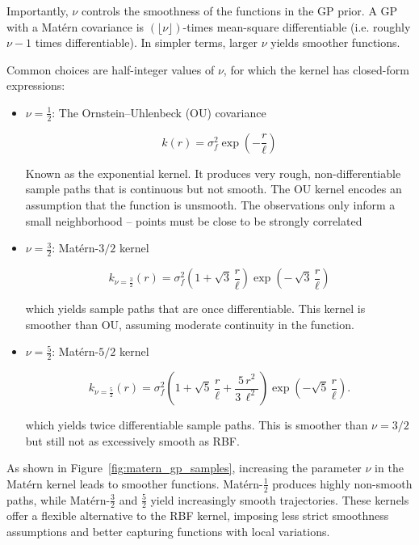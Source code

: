 \documentclass{ut-thesis}
\begin{document}
Importantly, $\nu$ controls the smoothness of the functions in the GP prior. A GP with a Matérn covariance is $(\lfloor \nu \rfloor)$-times mean-square differentiable (i.e. roughly $\nu - 1$ times differentiable). In simpler terms, larger $\nu$ yields smoother functions. 

Common choices are half-integer values of $\nu$, for which the kernel has closed-form expressions:

\begin{itemize}
    \item $\nu = \frac{1}{2}$: The Ornstein–Uhlenbeck (OU) covariance
    
    \begin{equation}
    k(r) = \sigma_f^2 \exp\left( -\frac{r}{\ell}\right)
    \end{equation}

    Known as the exponential kernel. It produces very rough, non-differentiable sample paths that is continuous but not smooth. The OU kernel encodes an assumption that the function is unsmooth. The observations only inform a small neighborhood – points must be close to be strongly correlated

    \item $\nu = \frac{3}{2}$: Matérn-$3/2$ kernel

    \begin{equation}
        k_{\nu=\frac{3}{2}}(r) = \sigma_f^2 
        \left(1 + \sqrt{3}\,\frac{r}{\ell}\right)\exp\!\left(-\,\sqrt{3}\,\frac{r}{\ell}\right)
    \end{equation}

    which yields sample paths that are once differentiable. This kernel is smoother than OU, assuming moderate continuity in the function.

    \item $\nu = \frac{5}{2}$: Matérn-$5/2$ kernel

    \begin{equation}
        k_{\nu=\frac{5}{2}}(r) = \sigma_f^2 \left(1 + \sqrt{5}\,\frac{r}{\ell}+ \frac{5\,r^2}{3\,\ell^2}\right)\exp\!\left(-\sqrt{5}\,\frac{r}{\ell}\right).
    \end{equation}

    which yields twice differentiable sample paths. This is smoother than $\nu=3/2$ but still not as excessively smooth as RBF.
\end{itemize}

As shown in Figure~\ref{fig:matern_gp_samples}, increasing the parameter \( \nu \) in the Matérn kernel leads to smoother functions. Matérn-\( \frac{1}{2} \) produces highly non-smooth paths, while Matérn-\( \frac{3}{2} \) and \( \frac{5}{2} \) yield increasingly smooth trajectories. These kernels offer a flexible alternative to the RBF kernel, imposing less strict smoothness assumptions and better capturing functions with local variations.
\end{document}
